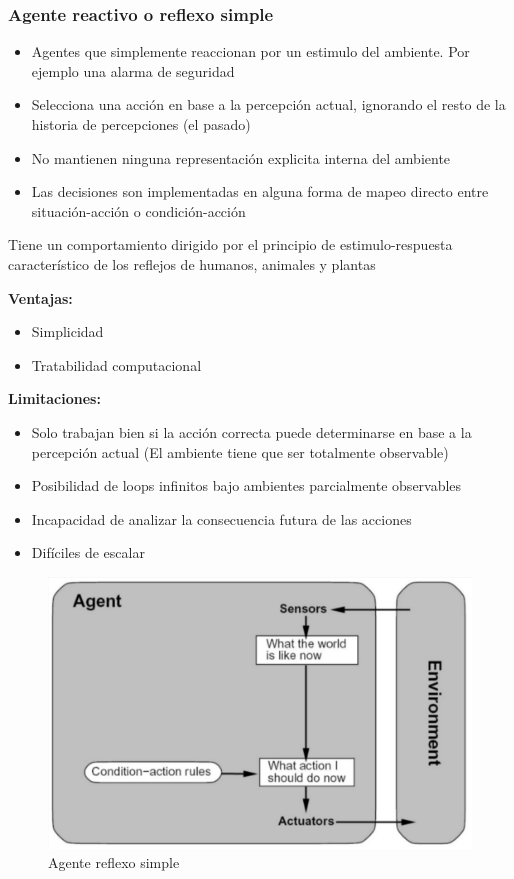 \subsubsection*{Agente reactivo o reflexo simple}
\begin{itemize}
  \item Agentes que simplemente reaccionan por un estimulo del ambiente. Por ejemplo una alarma de seguridad
  \item Selecciona una acción en base a la percepción actual, ignorando el resto de la historia de percepciones (el pasado)
  \item No mantienen ninguna representación explicita interna del ambiente
  \item Las decisiones son implementadas en alguna forma de mapeo directo entre situación-acción o condición-acción
\end{itemize}

Tiene un comportamiento dirigido por el principio de estimulo-respuesta característico de los reflejos de humanos, animales y plantas

\textbf{Ventajas: }
\begin{itemize}
  \item Simplicidad
  \item Tratabilidad computacional
\end{itemize}

\textbf{Limitaciones: }
\begin{itemize}
  \item Solo trabajan bien si la acción correcta puede determinarse en base a la percepción actual (El ambiente tiene que ser totalmente observable)
  \item Posibilidad de loops infinitos bajo ambientes parcialmente observables
  \item Incapacidad de analizar la consecuencia futura de las acciones
  \item Difíciles de escalar
\end{itemize}

\begin{figure}
  \centering
  \includegraphics[width=16cm, scale=1]{Images/Imagenes/AgenteReflexoSimple.png}
  \caption{Agente reflexo simple}
\end{figure}

